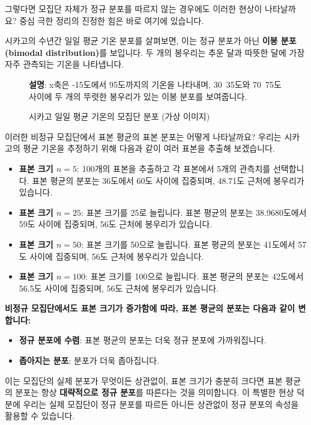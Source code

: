 \documentclass[11pt,a4paper]{book}
\theoremstyle{definition}
\begin{document}
그렇다면 모집단 자체가 정규 분포를 따르지 않는 경우에도 이러한 현상이 나타날까요? 중심 극한 정리의 진정한 힘은 바로 여기에 있습니다.

\begin{examplebox}[title={예시: 시카고 일일 평균 기온 분포}]
시카고의 수년간 일일 평균 기온 분포를 살펴보면, 이는 정규 분포가 아닌 \textbf{이봉 분포(bimodal distribution)}를 보입니다. 두 개의 봉우리는 추운 달과 따뜻한 달에 가장 자주 관측되는 기온을 나타냅니다.

\begin{figure}[h!]
    \centering
    \caption{시카고 일일 평균 기온의 모집단 분포 (가상 이미지)}
    \label{fig:chicago_pop}
    \textbf{설명}: x축은 -15도에서 95도까지의 기온을 나타내며, 30~35도와 70~75도 사이에 두 개의 뚜렷한 봉우리가 있는 이봉 분포를 보여줍니다.
\end{figure}

이러한 비정규 모집단에서 표본 평균의 표본 분포는 어떻게 나타날까요? 우리는 시카고의 평균 기온을 추정하기 위해 다음과 같이 여러 표본을 추출해 보겠습니다.
\begin{itemize}
    \item \textbf{표본 크기 $n=5$}: 100개의 표본을 추출하고 각 표본에서 5개의 관측치를 선택합니다. 표본 평균의 분포는 36도에서 60도 사이에 집중되며, 48.71도 근처에 봉우리가 있습니다.
    \item \textbf{표본 크기 $n=25$}: 표본 크기를 25로 늘립니다. 표본 평균의 분포는 38.9680도에서 59도 사이에 집중되며, 56도 근처에 봉우리가 있습니다.
    \item \textbf{표본 크기 $n=50$}: 표본 크기를 50으로 늘립니다. 표본 평균의 분포는 41도에서 57도 사이에 집중되며, 56도 근처에 봉우리가 있습니다.
    \item \textbf{표본 크기 $n=100$}: 표본 크기를 100으로 늘립니다. 표본 평균의 분포는 42도에서 56.5도 사이에 집중되며, 56도 근처에 봉우리가 있습니다.
\end{itemize}
\end{examplebox}

\begin{summarybox}[title={비정규 모집단에 대한 CLT의 결론}]
\textbf{비정규 모집단에서도 표본 크기가 증가함에 따라, 표본 평균의 분포는 다음과 같이 변합니다:}
\begin{itemize}
    \item \textbf{정규 분포에 수렴}: 표본 평균의 분포는 더욱 정규 분포에 가까워집니다.
    \item \textbf{좁아지는 분포}: 분포가 더욱 좁아집니다.
\end{itemize}
이는 모집단의 실제 분포가 무엇이든 상관없이, 표본 크기가 충분히 크다면 표본 평균의 분포는 항상 \textbf{대략적으로 정규 분포}를 따른다는 것을 의미합니다. 이 특별한 현상 덕분에 우리는 실제 모집단이 정규 분포를 따르든 아니든 상관없이 정규 분포의 속성을 활용할 수 있습니다.
\end{summarybox}
\end{document}
